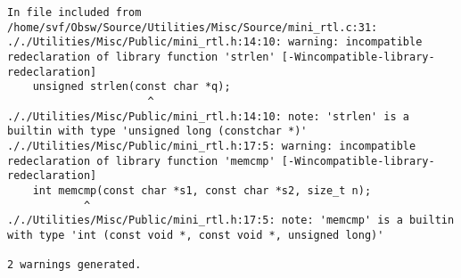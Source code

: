 
\noindent\begin{minipage}{\textwidth}
\begin{lstlisting}[language={}, caption=10th warning example., label=srciror_10]
In file included from /home/svf/Obsw/Source/Utilities/Misc/Source/mini_rtl.c:31: ././Utilities/Misc/Public/mini_rtl.h:14:10: warning: incompatible redeclaration of library function 'strlen' [-Wincompatible-library-redeclaration]
	unsigned strlen(const char *q);
					  ^
././Utilities/Misc/Public/mini_rtl.h:14:10: note: 'strlen' is a builtin with type 'unsigned long (constchar *)'
././Utilities/Misc/Public/mini_rtl.h:17:5: warning: incompatible redeclaration of library function 'memcmp' [-Wincompatible-library-redeclaration]
	int memcmp(const char *s1, const char *s2, size_t n);
			^
././Utilities/Misc/Public/mini_rtl.h:17:5: note: 'memcmp' is a builtin with type 'int (const void *, const void *, unsigned long)'

2 warnings generated.
\end{lstlisting}
\end{minipage}